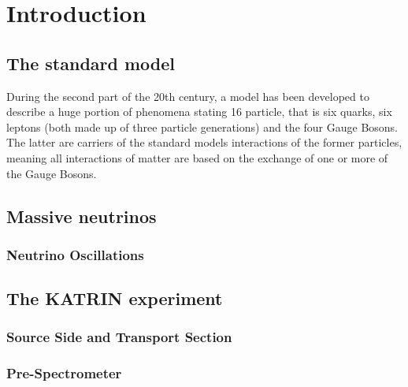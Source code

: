 
\chapter{Introduction}
\label{ch:Introduction}
    \section{The standard model}
    \label{ch:Introduction:sec:The standard model}
    During the second part of the 20th century, a model has been developed to describe a huge portion of phenomena stating 16 particle, that is six quarks, six leptons (both made up of three particle generations) and the four Gauge Bosons. The latter are carriers of the standard models interactions of the former particles, meaning all interactions of matter are based on the exchange of one or more of the Gauge Bosons.
      \subsection{}
      \label{ch:Introduction:sec:The standard model}
    
    \section{Massive neutrinos}
    \label{ch:Introduction:sec:Massive neutrino}
    
      \subsection{Neutrino Oscillations}
      \label{ch:Introduction:sec:Massive neutrino:subsec:neutrino Oscillations}
    
    \section{The KATRIN experiment}
    \label{ch:Introduction:sec:The KATRIN experiment}
      
      \subsection{Source Side and Transport Section}
      \label{ch:Introduction:sec:The KATRIN experiment:subsec:sourceSide}
      
      \subsection{Pre-Spectrometer}
      \label{ch:Introduction:sec:The KATRIN experiment:subsec:sourceSide}
      

